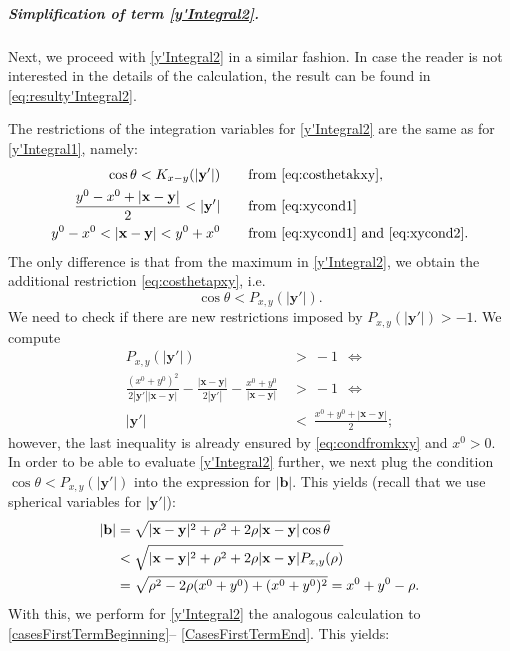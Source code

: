 \documentclass[b5paper,draft,openbib,12pt]{memoir}
\newcommand{\vx}{\mathbf{x}}
\newcommand{\vy}{\mathbf{y}}
\newcommand{\vb}{\mathbf{b}}
\begin{document}
\subparagraph{Simplification of term \eqref{y'Integral2}.}
Next, we proceed with \eqref{y'Integral2} in a similar fashion. In case the reader is not interested in the details of the calculation, the result can be found in \eqref{eq:resulty'Integral2}.

The restrictions of the integration variables for 
\eqref{y'Integral2} are the same as for 
\eqref{y'Integral1}, namely:
\begin{align}
\cos\theta<K_{x-y}(|\vy'|)\quad\quad   &\text{from } \eqref{eq:costhetakxy},\\
\frac{y^0-x^0+|\vx-\vy|}{2} < |\vy'| \quad\quad  &\text{from } \eqref{eq:xycond1}\label{eq:condfromkxy}\\
y^0-x^0<|\vx-\vy|<y^0+x^0 \quad\quad  &\text{from \eqref{eq:xycond1} and } \eqref{eq:xycond2}.
\end{align}
The only difference is that from the maximum in 
\eqref{y'Integral2}, we obtain the additional 
restriction \eqref{eq:costhetapxy}, i.e.
\begin{equation}
	\cos\theta< P_{x,y}(|\vy'|).
\end{equation}
We need to check if there are new restrictions imposed 
by \(P_{x,y}(|\vy'|)>-1\). We compute
\begin{align}
    P_{x,y}(|\vy'|) ~&>~ -1~~ \iff\nonumber\\
     \frac{(x^0+y^0)^2}{2|\vy'||\vx-\vy|} - \frac{|\vx-\vy|}{2|\vy'|} - \frac{x^0+y^0}{|\vx-\vy|}~&>~-1    ~~\iff\nonumber \\
   |\vy'| ~&<~ \frac{x^0+y^0+|\vx-\vy|}{2};
\end{align}
however, the last inequality is already ensured by 
\eqref{eq:condfromkxy} and $x^0>0$. 
In order to be able to evaluate \eqref{y'Integral2} 
further, we next plug the condition 
$\cos \theta < P_{x,y}(|\vy'|)$ into the expression 
for $|\vb|$. This yields (recall that we use spherical 
variables for $|\vy'|$):
\begin{align}\label{PlugPIn}
   |\vb| &= \sqrt{|\vx-\vy|^2+\rho^2 + 2 \rho |\vx-\vy| \cos \theta} \notag\\
   &< \sqrt{|\vx-\vy|^2+\rho^2 + 2 \rho |\vx-\vy| P_{x,y}(\rho)}\nonumber\\
    &= \sqrt{\rho^2 - 2\rho(x^0+y^0) +(x^0+y^0)^2}=x^0+y^0-\rho.
\end{align}
With this, we perform for \eqref{y'Integral2} the 
analogous calculation to 
\eqref{casesFirstTermBeginning}--
\eqref{CasesFirstTermEnd}. This yields:
\end{document}
